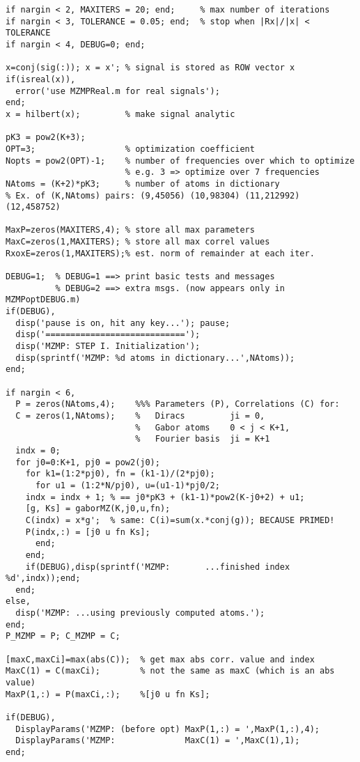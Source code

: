 \begin{verbatim}
if nargin < 2, MAXITERS = 20; end;     % max number of iterations
if nargin < 3, TOLERANCE = 0.05; end;  % stop when |Rx|/|x| < TOLERANCE
if nargin < 4, DEBUG=0; end;

x=conj(sig(:)); x = x'; % signal is stored as ROW vector x
if(isreal(x)),
  error('use MZMPReal.m for real signals');
end;
x = hilbert(x);         % make signal analytic

pK3 = pow2(K+3);
OPT=3;                  % optimization coefficient
Nopts = pow2(OPT)-1;    % number of frequencies over which to optimize
                        % e.g. 3 => optimize over 7 frequencies
NAtoms = (K+2)*pK3;     % number of atoms in dictionary
% Ex. of (K,NAtoms) pairs: (9,45056) (10,98304) (11,212992) (12,458752)

MaxP=zeros(MAXITERS,4); % store all max parameters
MaxC=zeros(1,MAXITERS); % store all max correl values
RxoxE=zeros(1,MAXITERS);% est. norm of remainder at each iter.

DEBUG=1;  % DEBUG=1 ==> print basic tests and messages 
          % DEBUG=2 ==> extra msgs. (now appears only in MZMPoptDEBUG.m)
if(DEBUG),
  disp('pause is on, hit any key...'); pause;
  disp('============================');
  disp('MZMP: STEP I. Initialization');
  disp(sprintf('MZMP: %d atoms in dictionary...',NAtoms));
end;

if nargin < 6,
  P = zeros(NAtoms,4);    %%% Parameters (P), Correlations (C) for:
  C = zeros(1,NAtoms);    %   Diracs         ji = 0, 
                          %   Gabor atoms    0 < j < K+1,
                          %   Fourier basis  ji = K+1
  indx = 0;
  for j0=0:K+1, pj0 = pow2(j0);
    for k1=(1:2*pj0), fn = (k1-1)/(2*pj0);
      for u1 = (1:2*N/pj0), u=(u1-1)*pj0/2;
	indx = indx + 1; % == j0*pK3 + (k1-1)*pow2(K-j0+2) + u1;
	[g, Ks] = gaborMZ(K,j0,u,fn);
	C(indx) = x*g';  % same: C(i)=sum(x.*conj(g)); BECAUSE PRIMED!
	P(indx,:) = [j0 u fn Ks];
      end;
    end; 
    if(DEBUG),disp(sprintf('MZMP:       ...finished index %d',indx));end;
  end;
else,
  disp('MZMP: ...using previously computed atoms.');
end;
P_MZMP = P; C_MZMP = C;

[maxC,maxCi]=max(abs(C));  % get max abs corr. value and index
MaxC(1) = C(maxCi);        % not the same as maxC (which is an abs value)
MaxP(1,:) = P(maxCi,:);    %[j0 u fn Ks];

if(DEBUG),
  DisplayParams('MZMP: (before opt) MaxP(1,:) = ',MaxP(1,:),4);
  DisplayParams('MZMP:              MaxC(1) = ',MaxC(1),1);
end;


\end{verbatim}
